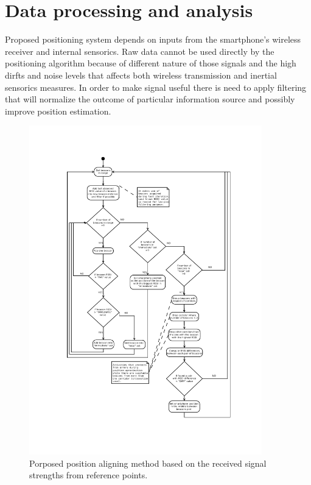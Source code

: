 \documentclass[../main.tex]{subfiles}
\begin{document}
\section{Data processing and analysis} %
\label{sec:data_processing}

Proposed positioning system depends on inputs from the smartphone's wireless receiver and internal sensorics. Raw data cannot be used directly by the positioning algorithm because of different nature of those signals and the high dirfts and noise levels that affects both wireless transmission and inertial sensorics measures. In order to make signal useful there is need to apply filtering that will normalize the outcome of particular information source and possibly improve position estimation.

\begin{figure}[ht]
\includegraphics[width=0.9\textwidth, trim={2cm 2cm 2cm 2cm},clip]{pictures/architecture_beacons_processing.pdf}
\centering
\caption{Porposed position aligning method based on the received signal strengths from reference points.}
\label{fig:architecture_beacons_processing}
\end{figure}
\end{document}
